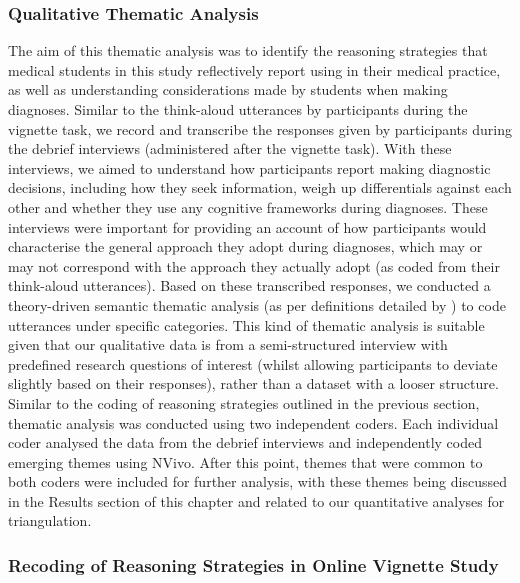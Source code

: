 \documentclass[a4paper, nobind]{templates/ociamthesis}
\begin{document}
\subsubsection*{Qualitative Thematic Analysis}\label{qualitative-thematic-analysis}

The aim of this thematic analysis was to identify the reasoning strategies that medical students in this study reflectively report using in their medical practice, as well as understanding considerations made by students when making diagnoses. Similar to the think-aloud utterances by participants during the vignette task, we record and transcribe the responses given by participants during the debrief interviews (administered after the vignette task). With these interviews, we aimed to understand how participants report making diagnostic decisions, including how they seek information, weigh up differentials against each other and whether they use any cognitive frameworks during diagnoses. These interviews were important for providing an account of how participants would characterise the general approach they adopt during diagnoses, which may or may not correspond with the approach they actually adopt (as coded from their think-aloud utterances). Based on these transcribed responses, we conducted a theory-driven semantic thematic analysis (as per definitions detailed by \autocite{braun_using_2006}) to code utterances under specific categories. This kind of thematic analysis is suitable given that our qualitative data is from a semi-structured interview with predefined research questions of interest (whilst allowing participants to deviate slightly based on their responses), rather than a dataset with a looser structure. Similar to the coding of reasoning strategies outlined in the previous section, thematic analysis was conducted using two independent coders. Each individual coder analysed the data from the debrief interviews and independently coded emerging themes using NVivo. After this point, themes that were common to both coders were included for further analysis, with these themes being discussed in the Results section of this chapter and related to our quantitative analyses for triangulation.

\subsubsection*{Recoding of Reasoning Strategies in Online Vignette Study}\label{recoding-of-reasoning-strategies-in-online-vignette-study}
\end{document}
